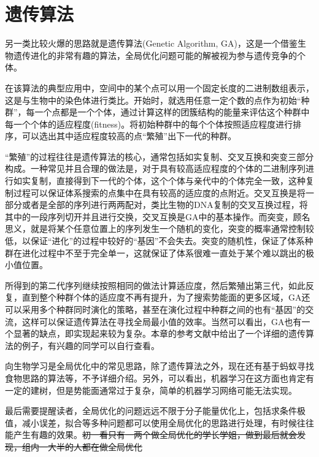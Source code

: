 \documentclass[12pt,a4paper,openany,twoside]{book}
\numberwithin{equation}{section}
\begin{document}
      \section{遗传算法}
        另一类比较火爆的思路就是遗传算法(Genetic Algorithm, GA)，这是一个借鉴生物遗传进化的非常有趣的算法，全局优化问题可能的解被视为参与遗传竞争的个体。
        
        在该算法的典型应用中，空间中的某个点可以用一个固定长度的二进制数组表示，这是与生物中的染色体进行类比。开始时，就选用任意一定个数的点作为初始“种群”，每一个点都是一个个体，通过计算这样的团簇结构的能量来评估这个种群中每一个个体的适应程度(fitness)。将初始种群中的每个个体按照适应程度进行排序，可以选出其中适应程度较高的点“繁殖”出下一代的种群。
        
        “繁殖”的过程往往是遗传算法的核心，通常包括如实复制、交叉互换和突变三部分构成。一种常见并且合理的做法是，对于具有较高适应程度的个体的二进制序列进行如实复制，直接得到下一代的个体，这个个体与亲代中的个体完全一致，这种复制过程可以保证体系搜索的点集中在具有较高的适应度的点附近。交叉互换是将一部分或者是全部的序列进行两两配对，类比生物的DNA复制的交叉互换过程，将其中的一段序列切开并且进行交换，交叉互换是GA中的基本操作。而突变，顾名思义，就是将某个任意位置上的序列发生一个随机的变化，突变的概率通常控制较低，以保证“进化”的过程中较好的“基因”不会失去。突变的随机性，保证了体系种群在进化过程中不至于完全单一，这就保证了体系很难一直处于某个难以跳出的极小值位置。

        所得到的第二代序列继续按照相同的做法计算适应度，然后繁殖出第三代，如此反复，直到整个种群个体的适应度不再有提升，为了搜索势能面的更多区域，GA还可以采用多个种群同时演化的策略，甚至在演化过程中种群之间的也有“基因”的交流，这样可以保证遗传算法在寻找全局最小值的效率。当然可以看出，GA也有一个显著的缺点，即实现起来较为复杂。本章的参考文献中给出了一个详细的遗传算法的例子，有兴趣的同学可以自行查看。

        向生物学习是全局优化中的常见思路，除了遗传算法之外，现在还有基于蚂蚁寻找食物思路的算法等，不予详细介绍。另外，可以看出，机器学习在这方面也肯定有一定的建树，但是势能面通常过于复杂，简单的机器学习网络可能无法实现。

        最后需要提醒读者，全局优化的问题远远不限于分子能量优化上，包括求条件极值，减小误差，拟合等多种问题都可以使用全局优化的思路进行处理，有时候往往能产生有趣的效果。\sout{初一看只有一两个做全局优化的学长学姐，做到最后就会发现，组内一大半的人都在做全局优化}
\end{document}
